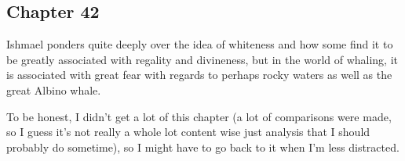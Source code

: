 \subsection{Chapter 42}

Ishmael ponders quite deeply over the idea of whiteness and how some find it to
be greatly associated with regality and divineness, but in the world of
whaling, it is associated with great fear with regards to perhaps rocky waters
as well as the great Albino whale.

To be honest, I didn't get a lot of this chapter (a lot of comparisons were
made, so I guess it's not really a whole lot content wise just analysis that I
should probably do sometime), so I might have to go back to it when I'm less
distracted.
